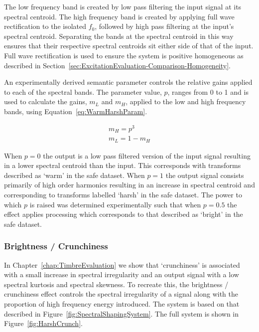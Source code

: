 			The low frequency band is created by low pass filtering the input signal at its spectral centroid.
			The high frequency band is created by applying full wave rectification to the isolated $f_{0}$,
			followed by high pass filtering at the input's spectral centroid.  Separating the bands at the
			spectral centroid in this way ensures that their respective spectral centroids sit either side of
			that of the input. Full wave rectification is used to ensure the system is positive homogeneous as
			described in Section~\ref{sec:ExcitationEvaluation-Comparison-Homogeneity}.

			An experimentally derived semantic parameter controls the relative gains applied to each of the
			spectral bands. The parameter value, $p$, ranges from 0 to 1 and is used to calculate the gains,
			$m_{L}$ and $m_{H}$, applied to the low and high frequency bands, using
			Equation~\ref{eq:WarmHarshParam}.

			\begin{gather}
				m_{H} = p^{3} \nonumber \\
				m_{L} = 1 - m_{H}
				\label{eq:WarmHarshParam}
			\end{gather}

			When $p = 0$  the output is a low pass filtered version of the input signal resulting in a lower
			spectral centroid than the input. This corresponds with transforms described as `warm' in the
			\acrshort{safe} dataset. When $p = 1$ the output signal consists primarily of high order harmonics
			resulting in an increase in spectral centroid and corresponding to transforms labelled `harsh' in
			the \acrshort{safe} dataset.  The power to which $p$ is raised was determined experimentally such
			that when $p = 0.5$ the effect applies processing which corresponds to that described as `bright'
			in the \acrshort{safe} dataset. 

		\subsubsection*{Brightness / Crunchiness}
			In Chapter~\ref{chap:TimbreEvaluation} we show that `crunchiness' is associated with a small
			increase in spectral irregularity and an output signal with a low spectral kurtosis and spectral
			skewness. To recreate this, the brightness / crunchiness effect controls the spectral irregularity
			of a signal along with the proportion of high frequency energy introduced.  The system is based on
			that described in Figure~\ref{fig:SpectralShapingSystem}. The full system is shown in
			Figure~\ref{fig:HarshCrunch}.

